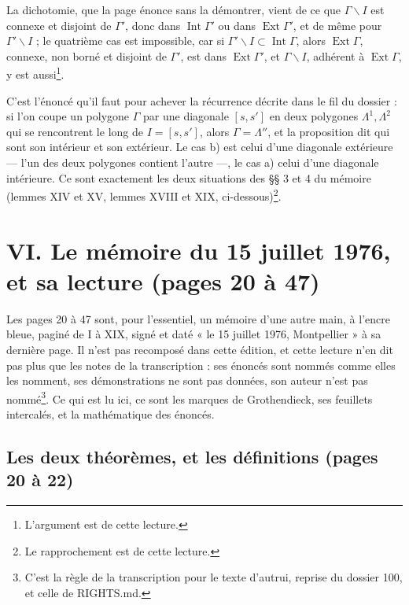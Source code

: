 \documentclass[11pt,a4paper]{article}
\begin{document}
La dichotomie, que la page énonce sans la démontrer, vient de ce que $\Gamma
\smallsetminus I$ est connexe et disjoint de $\Gamma'$, donc dans
$\operatorname{Int}\Gamma'$ ou dans $\operatorname{Ext}\Gamma'$, et de même pour
$\Gamma' \smallsetminus I$ ; le quatrième cas est impossible, car si $\Gamma'
\smallsetminus I \subset \operatorname{Int}\Gamma$, alors
$\operatorname{Ext}\Gamma$, connexe, non borné et disjoint de $\Gamma'$, est
dans $\operatorname{Ext}\Gamma'$, et $\Gamma \smallsetminus I$, adhérent à
$\operatorname{Ext}\Gamma$, y est aussi\footnote{L'argument est de cette
lecture.}.

C'est l'énoncé qu'il faut pour achever la récurrence décrite dans le fil du
dossier : si l'on coupe un polygone $\Gamma$ par une diagonale $[s, s']$ en deux
polygones $\Lambda^1, \Lambda^2$ qui se rencontrent le long de $I = [s, s']$,
alors $\Gamma = \Lambda''$, et la proposition dit qui sont son intérieur et son
extérieur. Le cas b) est celui d'une diagonale extérieure — l'un des deux
polygones contient l'autre —, le cas a) celui d'une diagonale intérieure. Ce
sont exactement les deux situations des §§ 3 et 4 du mémoire (lemmes XIV et XV,
lemmes XVIII et XIX, ci-dessous)\footnote{Le rapprochement est de cette
lecture.}.

\section*{VI. Le mémoire du 15 juillet 1976, et sa lecture (pages 20 à 47)}

Les pages 20 à 47 sont, pour l'essentiel, un mémoire d'une autre main, à
l'encre bleue, paginé de I à XIX, signé et daté « le 15 juillet 1976,
Montpellier » à sa dernière page. Il n'est pas recomposé dans cette édition, et
cette lecture n'en dit pas plus que les notes de la transcription : ses énoncés
sont nommés comme elles les nomment, ses démonstrations ne sont pas données,
son auteur n'est pas nommé\footnote{C'est la règle de la transcription pour le
texte d'autrui, reprise du dossier 100, et celle de RIGHTS.md.}. Ce qui est lu
ici, ce sont les marques de Grothendieck, ses feuillets intercalés, et la
mathématique des énoncés.

\subsection*{Les deux théorèmes, et les définitions (pages 20 à 22)}
\end{document}
